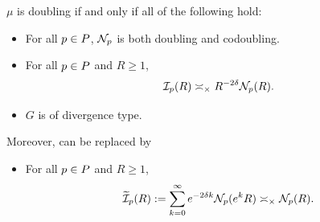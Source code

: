 \begin{proposition}
\label{propositiondoubling}
$\mu$ is doubling if and only if all of the following hold:
\begin{itemize}
\item[(I)] For all $p\in P$, $\mathcal N_p$ is both doubling and codoubling.
\item[(II)] For all $p\in P$ and $R\geq 1$,
\begin{equation}
\label{INasymp2}
\mathcal I_p(R) \asymp_\times R^{-2\delta} \mathcal N_p(R).
\end{equation}
\item[(III)] $G$ is of divergence type.
\end{itemize}
Moreover,  can be replaced by
\begin{itemize}
\item[(II$'$)] For all $p\in P$ and $R\geq 1$,
\begin{equation}
\label{INasymp3}
\widetilde{\mathcal I}_p(R) := \sum_{k = 0}^\infty e^{-2\delta k} \mathcal N_p(e^k R) \asymp_\times \mathcal N_p(R).
\end{equation}
\end{itemize}
\end{proposition}


